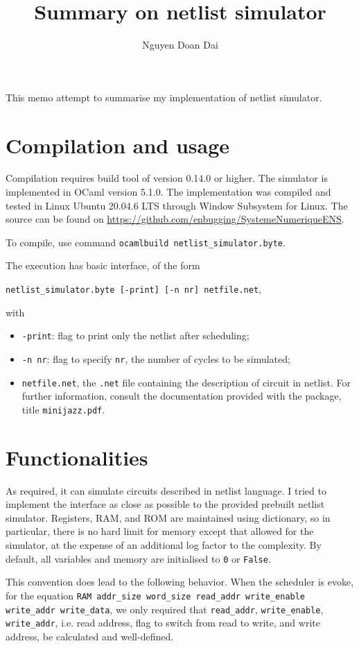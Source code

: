 \documentclass{amsart}
\title{Summary on netlist simulator}
\author{Nguyen Doan Dai}
\begin{document}
	\maketitle
	
	This memo attempt to summarise my implementation of netlist simulator.
	
	\section{Compilation and usage}
	Compilation requires build tool  of version 0.14.0 or higher. The simulator is implemented in OCaml version 5.1.0. The implementation was compiled and tested in Linux Ubuntu 20.04.6 LTS through Window Subsystem for Linux. The source can be found on \url{https://github.com/enbugging/SystemeNumeriqueENS}.
	
	To compile, use command \texttt{ocamlbuild netlist\_simulator.byte}.
	
	The execution has basic interface, of the form 
	
	\texttt{netlist\_simulator.byte [-print] [-n nr] netfile.net}, 
	
	with
	\begin{itemize}
		\item \texttt{-print}: flag to print only the netlist after scheduling;
		\item \texttt{-n nr}: flag to specify \texttt{nr}, the number of cycles to be simulated;
		\item \texttt{netfile.net}, the \texttt{.net} file containing the description of circuit in netlist. For further information, consult the documentation provided with the package, title \texttt{minijazz.pdf}.
	\end{itemize}
	
	\section{Functionalities}
	As required, it can simulate circuits described in netlist language. I tried to implement the interface as close as possible to the provided prebuilt netlist simulator. Registers, RAM, and ROM are maintained using dictionary, so in particular, there is no hard limit for memory except that allowed for the simulator, at the expense of an additional log factor to the complexity. By default, all variables and memory are initialised to \texttt{0} or \texttt{False}.
	
	This convention does lead to the following behavior. When the scheduler is evoke, for the equation \texttt{RAM addr\_size word\_size read\_addr write\_enable write\_addr write\_data}, we only required that \texttt{read\_addr}, \texttt{write\_enable}, \texttt{write\_addr}, i.e. read address, flag to switch from read to write, and write address, be calculated and well-defined.
	
\end{document}
